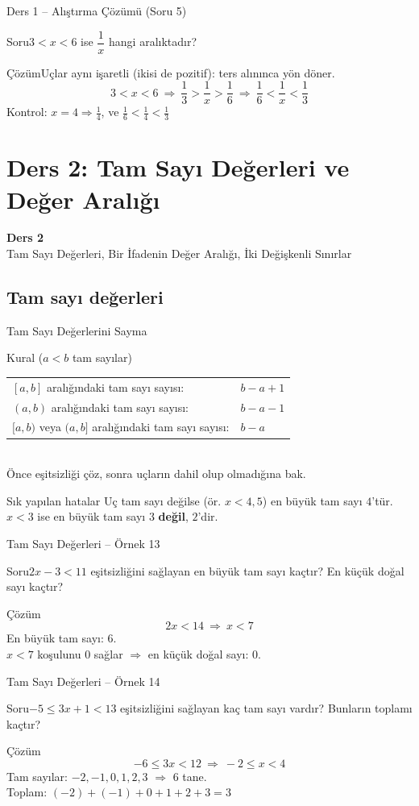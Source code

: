 \documentclass[aspectratio=169,11pt]{beamer}
\newcommand{\soru}[3]{%
\begin{frame}{#1}
  \begin{block}{Soru}\large #2\end{block}
  \pause
  \begin{exampleblock}{Çözüm}\large #3\end{exampleblock}
\end{frame}}
\begin{document}
\soru{Ders 1 -- Alıştırma Çözümü (Soru 5)}
{\(3<x<6\) ise \(\dfrac1x\) hangi aralıktadır?}
{Uçlar aynı işaretli (ikisi de pozitif): ters alınınca yön döner.
\[3<x<6\ \Rightarrow\ \frac13>\frac1x>\frac16\ \Rightarrow\ \frac16<\frac1x<\frac13\]
Kontrol: \(x=4\Rightarrow \frac14\), ve \(\frac16<\frac14<\frac13\) \checkmark}

\section{Ders 2: Tam Sayı Değerleri ve Değer Aralığı}
\begin{frame}
\centering\Large\color{anamavi}\textbf{Ders 2}\\[6pt]\normalsize Tam Sayı Değerleri, Bir İfadenin Değer Aralığı, İki Değişkenli Sınırlar
\end{frame}

\subsection{Tam sayı değerleri}
\begin{frame}{Tam Sayı Değerlerini Sayma}
\begin{block}{Kural (\(a<b\) tam sayılar)}
\renewcommand{\arraystretch}{1.2}
\begin{tabular}{@{}ll@{}}
\([a,b]\) aralığındaki tam sayı sayısı: & \(b-a+1\)\\
\((a,b)\) aralığındaki tam sayı sayısı: & \(b-a-1\)\\
\([a,b)\) veya \((a,b]\) aralığındaki tam sayı sayısı: & \(b-a\)
\end{tabular}\\[3pt]
Önce eşitsizliği çöz, sonra uçların dahil olup olmadığına bak.
\end{block}
\begin{alertblock}{Sık yapılan hatalar}
Uç tam sayı değilse (ör. \(x<4{,}5\)) en büyük tam sayı \(4\)'tür. \quad
\(x<3\) ise en büyük tam sayı \(3\) \textbf{değil}, \(2\)'dir.
\end{alertblock}
\end{frame}

\soru{Tam Sayı Değerleri -- Örnek 13}
{\(2x-3<11\) eşitsizliğini sağlayan en büyük tam sayı kaçtır? En küçük doğal sayı kaçtır?}
{\[2x<14\ \Rightarrow\ x<7\]
En büyük tam sayı: \(6\).\\[3pt]
\(x<7\) koşulunu \(0\) sağlar \(\Rightarrow\) en küçük doğal sayı: \(0\).}

\soru{Tam Sayı Değerleri -- Örnek 14}
{\(-5\le 3x+1<13\) eşitsizliğini sağlayan kaç tam sayı vardır? Bunların toplamı kaçtır?}
{\[-6\le 3x<12\ \Rightarrow\ -2\le x<4\]
Tam sayılar: \(-2,-1,0,1,2,3\) \(\Rightarrow\) \(6\) tane.\\[3pt]
Toplam: \((-2)+(-1)+0+1+2+3=3\)}
\end{document}
